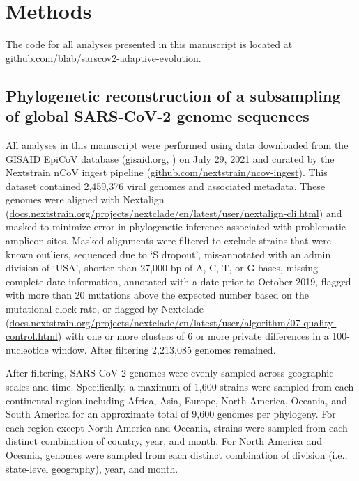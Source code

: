 \documentclass[11pt,oneside,letterpaper]{article}
\begin{document}
\section*{Methods}
\sloppy
The code for all analyses presented in this manuscript is located at \href{https://github.com/blab/sarscov2-adaptive-evolution}{github.com/blab/sarscov2-adaptive-evolution}.

\subsection*{Phylogenetic reconstruction of a subsampling of global SARS-CoV-2 genome sequences}
All analyses in this manuscript were performed using data downloaded from the GISAID EpiCoV database (\href{https://gisaid.org}{gisaid.org}, \cite{Shu2017-ql}) on July 29, 2021 and curated by the Nextstrain nCoV ingest pipeline (\href{https://github.com/nextstrain/ncov-ingest}{github.com/nextstrain/ncov-ingest}).
This dataset contained 2,459,376 viral genomes and associated metadata.
These genomes were aligned with Nextalign (\href{https://docs.nextstrain.org/projects/nextclade/en/latest/user/nextalign-cli.html}{docs.nextstrain.org/projects/nextclade/en/latest/user/nextalign-cli.html}) and masked to minimize error in phylogenetic inference associated with problematic amplicon sites.
Masked alignments were filtered to exclude strains that were known outliers, sequenced due to `S dropout', mis-annotated with an admin division of `USA', shorter than 27,000 bp of A, C, T, or G bases, missing complete date information, annotated with a date prior to October 2019, flagged with more than 20 mutations above the expected number based on the mutational clock rate, or flagged by Nextclade (\href{https://docs.nextstrain.org/projects/nextclade/en/latest/user/algorithm/07-quality-control.html}{docs.nextstrain.org/projects/nextclade/en/latest/user/algorithm/07-quality-control.html}) with one or more clusters of 6 or more private differences in a 100-nucleotide window.
After filtering 2,213,085 genomes remained.

After filtering, SARS-CoV-2 genomes were evenly sampled across geographic scales and time. Specifically, a maximum of 1,600 strains were sampled from each continental region including Africa, Asia, Europe, North America, Oceania, and South America for an approximate total of 9,600 genomes per phylogeny.
For each region except North America and Oceania, strains were sampled from each distinct combination of country, year, and month.
For North America and Oceania, genomes were sampled from each distinct combination of division (i.e., state-level geography), year, and month.
\end{document}
